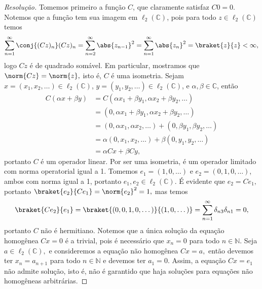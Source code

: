 \begin{proof}[Resolução]
    Tomemos primeiro a função \(C\), que claramente satisfaz \(C0 = 0\). Notemos que a função tem sua imagem em \(\ell_2(\mathbb{C})\), pois para todo \(z \in \ell_2(\mathbb{C})\) temos
    \begin{equation*}
       \sum_{n = 1}^{\infty} \conj{(Cz)_n} (Cz)_n = \sum_{n = 2}^{\infty} \abs{z_{n-1}}^2 = \sum_{n = 1}^\infty \abs{z_n}^2 = \braket{z}{z} < \infty,
    \end{equation*}
    logo \(Cz\) é de quadrado somável. Em particular, mostramos que \(\norm{Cz} = \norm{z},\) isto é, \(C\) é uma isometria. Sejam \(x = (x_1, x_2, \dots) \in \ell_2(\mathbb{C})\), \(y = (y_1, y_2, \dots) \in \ell_2(\mathbb{C})\), e \(\alpha, \beta \in \mathbb{C}\), então
    \begin{align*}
       C(\alpha x + \beta y) &= C \left(\alpha x_1 + \beta y_1, \alpha x_2 + \beta y_2, \dots\right)\\
                             &= \left(0, \alpha x_1 + \beta y_1, \alpha x_2 + \beta y_2, \dots\right)\\
                             &= (0, \alpha x_1, \alpha x_2, \dots) + (0, \beta y_1, \beta y_2, \dots)\\
                             &= \alpha (0, x_1, x_2, \dots) + \beta (0, y_1, y_2, \dots)\\
                             &= \alpha Cx + \beta Cy,
    \end{align*}
    portanto \(C\) é um operador linear. Por ser uma isometria, é um operador limitado com norma operatorial igual a 1. Tomemos \(e_1 = (1, 0, \dots)\) e \(e_2 = (0, 1, 0, \dots)\), ambos com norma igual a 1, portanto \(e_1, e_2 \in \ell_2(\mathbb{C})\). É evidente que \(e_2 = Ce_1,\) portanto \(\braket{e_2}{Ce_1} = \norm{e_2}^2 = 1,\) mas temos
    \begin{equation*}
       \braket{Ce_2}{e_1} = \braket{(0,0,1,0,\dots)}{(1,0,\dots)} = \sum_{n = 1}^\infty \delta_{n3} \delta_{n1} = 0,
    \end{equation*}
    portanto \(C\) não é hermitiano. Notemos que a única solução da equação homogênea \(Cx = 0\) é a trivial, pois é necessário que \(x_n = 0\) para todo \(n \in \mathbb{N}\). Seja \(a \in \ell_2(\mathbb{C}),\) e consideremos a equação não homogênea \(Cx = a,\) então devemos ter \(x_n = a_{n+1}\) para todo \(n \in \mathbb{N}\) e devemos ter \(a_1 = 0\). Assim, a equação \(Cx = e_1\) não admite solução, isto é, não é garantido que haja soluções para equações não homogêneas arbitrárias.


\end{proof}
